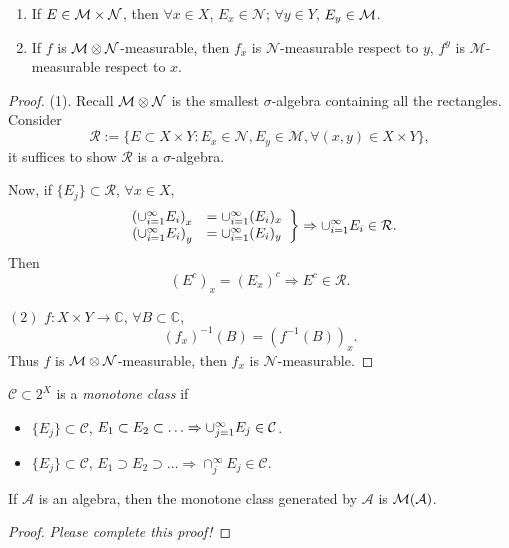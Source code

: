 \begin{prop}
    \label{Prop:SectionMeasurable}
    \begin{enumerate}
        \item If $E\in\mathcal{M}\times\mathcal{N}$, then $\forall x\in X$, 
        $E_{x}\in\mathcal{N}$; $\forall y\in Y$, $E_{y}\in\mathcal{M}$.
        \item If $f$ is $\mathcal{M}\otimes\mathcal{N}$-measurable, 
        then $f_x$ is $\mathcal{N}$-measurable respect to $y$, 
        $f^{y}$ is $\mathcal{M}$-measurable respect to $x$.
    \end{enumerate}
\end{prop}
\begin{proof}
    (1). Recall $\mathcal{M}\otimes\mathcal{N}$ is the smallest 
    $\sigma$-algebra containing all the rectangles. 
    Consider 
    \begin{displaymath}
        \mathcal{R}:=\{E\subset X\times Y: E_{x}\in\mathcal{N},
        E_{y}\in\mathcal{M},\forall(x,y)\in X\times Y\},
    \end{displaymath}
    it suffices to show $\mathcal{R}$ is a $\sigma$-algebra. 

    Now, if $\{E_{j}\}\subset\mathcal{R}$, $\forall x\in X$, 
    \begin{displaymath}
        \left.
        \begin{array}{rl}
        \left(\cup_{i=1}^{\infty}E_{i}\right)_{x}&=\cup_{i=1}^{\infty}(E_i)_{x}\\
        \left(\cup_{i=1}^{\infty}E_{i}\right)_{y}&=\cup_{i=1}^{\infty}(E_i)_{y}\\
        \end{array}
        \right\}\Rightarrow \cup_{i=1}^{\infty}E_{i}\in\mathcal{R}.
    \end{displaymath}
    Then 
    \begin{displaymath}
        (E^{c})_{x}=(E_{x})^{c}\Rightarrow E^{c}\in\mathcal{R}.
    \end{displaymath}

    $(2)$ $f:X\times Y\rightarrow\mathbb{C}$, 
    $\forall B\subset\mathbb{C}$, 
    \begin{displaymath}
        (f_{x})^{-1}(B)=(f^{-1}(B))_{x}.
    \end{displaymath}
    Thus $f$ is $\mathcal{M}\otimes\mathcal{N}$-measurable, 
    then $f_{x}$ is $\mathcal{N}$-measurable.
\end{proof}
\begin{defn}
    $\mathcal{C}\subset 2^{X}$ is a \textit{monotone class }if 
    \begin{itemize}
        \item $\{E_{j}\}\subset\mathcal{C}$, $E_{1}\subset E_{2}\subset
        \ldots\Rightarrow\cup_{j=1}^{\infty}E_{j}\in\mathcal{C}$.
        \item $\{E_{j}\}\subset\mathcal{C}$, $E_{1}\supset E_{2}\supset
        \ldots\Rightarrow\cap_{j}^{\infty}E_{j}\in\mathcal{C}$.
    \end{itemize}
\end{defn}
\begin{lem}
    \label{Lem:MonotoneClassLemma}
    If $\mathcal{A}$ is an algebra, then the monotone class 
    generated by $\mathcal{A}$ is $\mathcal{M}(\mathcal{A})$.
\end{lem}
\begin{proof}
    \textit{Please complete this proof!}
\end{proof}
